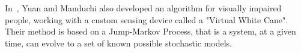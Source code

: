 In~\cite{yuan05dynamic}, Yuan and Manduchi also developed an algorithm for
visually impaired people, working with a custom sensing device called
a "Virtual White Cane". Their method is based on a Jump-Markov Process, that is
a system, at a given time, can evolve to a set of known possible stochastic
models.
